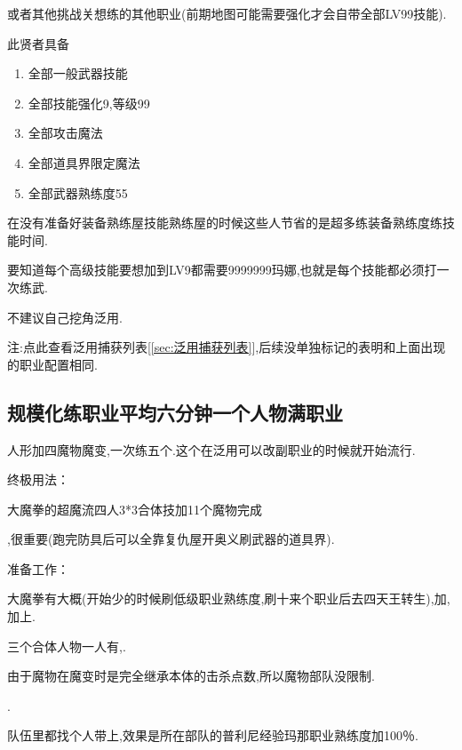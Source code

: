 		{\color{red}{去兔兔魔城挑战关,抓捕贤者}}或者其他挑战关想练的其他职业(前期地图可能需要强化才会自带全部LV99技能).

		此贤者具备
		\begin{enumerate}
			\item 全部一般武器技能
			\item 全部技能强化9,等级99
			\item 全部攻击魔法
			\item 全部道具界限定魔法
			\item 全部武器熟练度55
		\end{enumerate}
		
		在没有准备好装备熟练屋技能熟练屋的时候这些人节省的是超多练装备熟练度练技能时间.

		要知道每个高级技能要想加到LV9都需要9999999玛娜,也就是每个技能都必须打一次练武.

		不建议自己挖角泛用.

		注:点此查看泛用捕获列表[\ref{sec:泛用捕获列表}],后续没单独标记的表明和上面出现的职业配置相同.


		\subsection{规模化练职业平均六分钟一个人物满职业}


		人形加四魔物魔变,一次练五个.这个在泛用可以改副职业的时候就开始流行.

		终极用法：

		大魔拳的超魔流四人3*3合体技加11个魔物完成

		{\color{red}{修罗巴尔必备杰洛肯,有男主最好,需要大量千万级能力角色,所以这步可视为本修罗巴尔攻略法的必经之路}}

		{\color{red}{记得练上魔女和兔兔莉亚,同步探索魔界收集41武器}},很重要(跑完防具后可以全靠复仇屋开奥义刷武器的道具界).

		准备工作：

		大魔拳有大概{\color{red}{200万能力}}(开始少的时候刷低级职业熟练度,刷十来个职业后去四天王转生),加{\color{red}{主角的魔能力[合体技增加100％攻击力]}},加上{\color{red}{女主的魔能力[被魅惑的目标会被即死]}}.

		三个合体人物一人有{\color{red}{枪手的能力+魅惑术}},{\color{red}{都带上飞蛾魔能力}}.

		由于魔物在魔变时是完全继承本体的击杀点数,所以魔物部队没限制.

		{\color{red}{四人放到普利尼部队}}.

		队伍里都找个人带上{\color{red}{暴君的普利尼训练能力}},效果是所在部队的普利尼经验玛那职业熟练度加100％.

